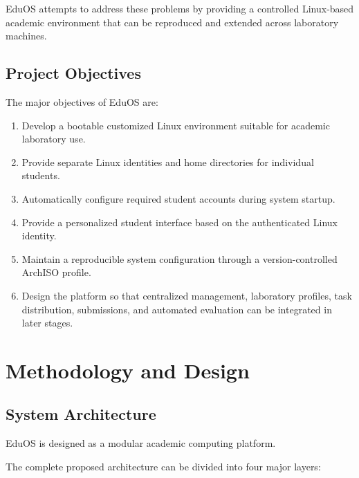 \documentclass{tietreport}
\begin{document}
EduOS attempts to address these problems by providing a controlled
Linux-based academic environment that can be reproduced and extended
across laboratory machines.

\section{Project Objectives}

The major objectives of EduOS are:

\begin{enumerate}

    \item Develop a bootable customized Linux environment suitable
    for academic laboratory use.

    \item Provide separate Linux identities and home directories for
    individual students.

    \item Automatically configure required student accounts during
    system startup.

    \item Provide a personalized student interface based on the
    authenticated Linux identity.

    \item Maintain a reproducible system configuration through a
    version-controlled ArchISO profile.

    \item Design the platform so that centralized management,
    laboratory profiles, task distribution, submissions, and
    automated evaluation can be integrated in later stages.

\end{enumerate}



\chapter{Methodology and Design}

\section{System Architecture}

EduOS is designed as a modular academic computing platform.

The complete proposed architecture can be divided into four major
layers:
\end{document}
